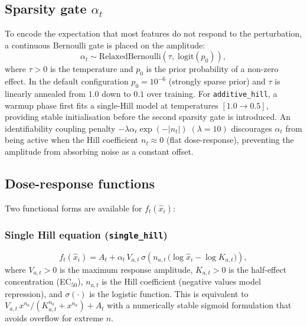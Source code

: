 \documentclass[12pt]{article}
\begin{document}
\subsection{Sparsity gate \texorpdfstring{$\alpha_t$}{alpha\_t}}
\label{sec:sparsity}

To encode the expectation that most features do not respond to the perturbation, a
continuous Bernoulli gate is placed on the amplitude:
\begin{equation}
  \alpha_t \sim \mathrm{RelaxedBernoulli}\!\left(
    \tau,\; \mathrm{logit}(p_0)\right),
\end{equation}
where $\tau > 0$ is the temperature and $p_0$ is the prior probability of a non-zero effect.
In the default configuration $p_0 = 10^{-6}$ (strongly sparse prior) and $\tau$ is linearly
annealed from $1.0$ down to $0.1$ over training.
For \texttt{additive\_hill}, a warmup phase first fits a single-Hill model at temperatures
$[1.0 \to 0.5]$, providing stable initialisation before the second sparsity gate is introduced.
%
An identifiability coupling penalty
$-\lambda \alpha_t \exp(-|n_t|) \; (\lambda = 10)$
discourages $\alpha_t$ from being active when the Hill coefficient $n_t \approx 0$
(flat dose-response), preventing the amplitude from absorbing noise as a constant offset.

\subsection{Dose-response functions}

Two functional forms are available for $f_t(\hat x_i)$:

\subsubsection{Single Hill equation (\texttt{single\_hill})}

\begin{equation}
  f_t(\hat x_i) = A_t + \alpha_t \, V_{a,t} \,
    \sigma\!\left(n_{a,t}\,\bigl(\log \hat x_i - \log K_{a,t}\bigr)\right),
  \label{eq:single_hill}
\end{equation}
where $V_{a,t} > 0$ is the maximum response amplitude, $K_{a,t} > 0$ is the
half-effect concentration (EC$_{50}$), $n_{a,t}$ is the Hill coefficient
(negative values model repression), and $\sigma(\cdot)$ is the logistic function.
This is equivalent to $V_{a,t}\,x^{n_a}/(K_{a,t}^{n_a} + x^{n_a}) + A_t$ with
a numerically stable sigmoid formulation that avoids overflow for extreme $n$.
\end{document}

